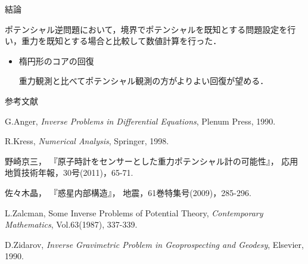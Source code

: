 \documentclass[dvipdfmx]{beamer}
\theoremstyle{remark}
\begin{document}
\begin{frame}{結論}

  ポテンシャル逆問題において，境界でポテンシャルを既知とする問題設定を行い，重力を既知とする場合と比較して数値計算を行った．

  \begin{itemize}

    \item 楕円形のコアの回復

    重力観測と比べてポテンシャル観測の方がよりよい回復が望める．
  \end{itemize}

\end{frame}

\begin{frame}{参考文献}
  \begin{thebibliography}{99}
    G.Anger, 
    \textit{Inverse Problems in Differential Equations},
    Plenum Press,
    1990.
  
  
    R.Kress,
    \textit{Numerical Analysis},
    Springer,
    1998.
  
    野崎京三，
    『原子時計をセンサーとした重力ポテンシャル計の可能性』，
    応用地質技術年報，30号(2011)，65-71.
  
    佐々木晶，
    『惑星内部構造』，
    地震，61巻特集号(2009)，285-296.
  
  
    L.Zalcman,
    Some Inverse Problems of Potential Theory,
    \textit{Contemporary Mathematics}, Vol.63(1987), 337-339.
  
    D.Zidarov, 
    \textit{Inverse Gravimetric Problem in Geoprospecting and Geodesy},
    Elsevier,
    1990.
  \end{thebibliography}

\end{frame}
\end{document}

